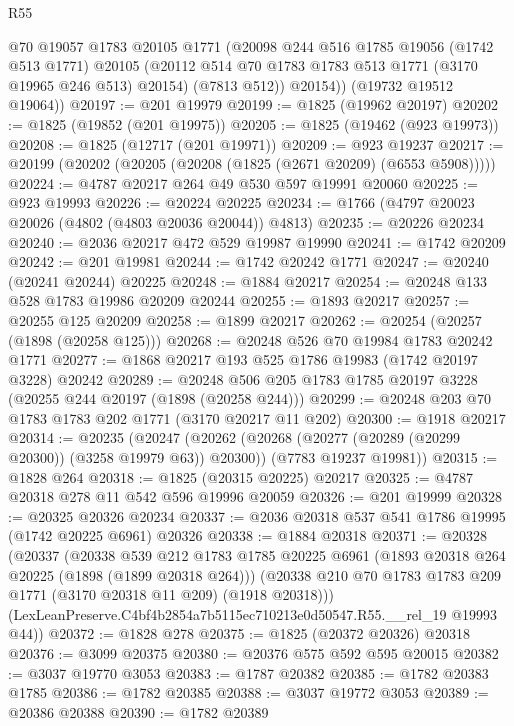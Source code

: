 \begin{lexlean}{R55}
\begin{coremodule}
          @70
          @19057
          @1783
          @20105
          @1771
          (@20098
            @244
            @516
            @1785
            @19056
            (@1742 @513 @1771)
            @20105
            (@20112 @514 @70 @1783 @1783 @513 @1771 (@3170 @19965 @246 @513) @20154)
            (@7813 @512))
          @20154))
      (@19732 @19512 @19064))
@20197 := @201 @19979
@20199 := @1825 (@19962 @20197)
@20202 := @1825 (@19852 (@201 @19975))
@20205 := @1825 (@19462 (@923 @19973))
@20208 := @1825 (@12717 (@201 @19971))
@20209 := @923 @19237
@20217 := @20199 (@20202 (@20205 (@20208 (@1825 (@2671 @20209) (@6553 @5908)))))
@20224 := @4787 @20217 @264 @49 @530 @597 @19991 @20060
@20225 := @923 @19993
@20226 := @20224 @20225
@20234 := @1766 (@4797 @20023 @20026 (@4802 (@4803 @20036 @20044)) @4813)
@20235 := @20226 @20234
@20240 := @2036 @20217 @472 @529 @19987 @19990
@20241 := @1742 @20209
@20242 := @201 @19981
@20244 := @1742 @20242 @1771
@20247 := @20240 (@20241 @20244) @20225
@20248 := @1884 @20217
@20254 := @20248 @133 @528 @1783 @19986 @20209 @20244
@20255 := @1893 @20217
@20257 := @20255 @125 @20209
@20258 := @1899 @20217
@20262 := @20254 (@20257 (@1898 (@20258 @125)))
@20268 := @20248 @526 @70 @19984 @1783 @20242 @1771
@20277 := @1868 @20217 @193 @525 @1786 @19983 (@1742 @20197 @3228) @20242
@20289 := @20248 @506 @205 @1783 @1785 @20197 @3228 (@20255 @244 @20197 (@1898 (@20258 @244)))
@20299 := @20248 @203 @70 @1783 @1783 @202 @1771 (@3170 @20217 @11 @202)
@20300 := @1918 @20217
@20314 := @20235
    (@20247
      (@20262 (@20268 (@20277 (@20289 (@20299 @20300)) (@3258 @19979 @63)) @20300))
      (@7783 @19237 @19981))
@20315 := @1828 @264
@20318 := @1825 (@20315 @20225) @20217
@20325 := @4787 @20318 @278 @11 @542 @596 @19996 @20059
@20326 := @201 @19999
@20328 := @20325 @20326 @20234
@20337 := @2036 @20318 @537 @541 @1786 @19995 (@1742 @20225 @6961) @20326
@20338 := @1884 @20318
@20371 := @20328
    (@20337
      (@20338
        @539
        @212
        @1783
        @1785
        @20225
        @6961
        (@1893 @20318 @264 @20225 (@1898 (@1899 @20318 @264)))
        (@20338 @210 @70 @1783 @1783 @209 @1771 (@3170 @20318 @11 @209) (@1918 @20318)))
      (LexLeanPreserve.C4bf4b2854a7b5115ec710213e0d50547.R55.__rel_19 @19993 @44))
@20372 := @1828 @278
@20375 := @1825 (@20372 @20326) @20318
@20376 := @3099 @20375
@20380 := @20376 @575 @592 @595 @20015
@20382 := @3037 @19770 @3053
@20383 := @1787 @20382
@20385 := @1782 @20383 @1785
@20386 := @1782 @20385
@20388 := @3037 @19772 @3053
@20389 := @20386 @20388
@20390 := @1782 @20389

\end{coremodule}
\end{lexlean}
